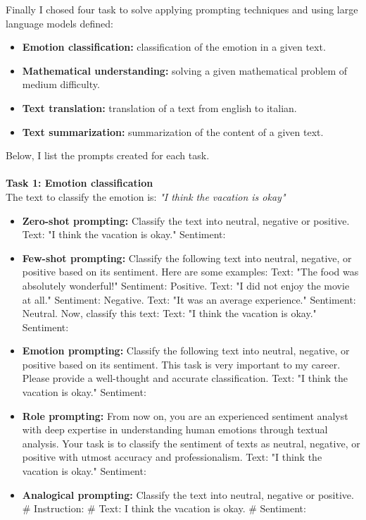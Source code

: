 Finally I chosed four task to solve applying prompting techniques and using large language models defined:
\begin{itemize}
    \item \textbf{Emotion classification:} classification of the emotion in a given text.

    \item \textbf{Mathematical understanding:} solving a given mathematical problem of medium difficulty. 

    \item \textbf{Text translation:} translation of a text from english to italian.

    \item \textbf{Text summarization:} summarization of the content of a given text.
\end{itemize}
Below, I list the prompts created for each task.\\\\
\textbf{Task 1: Emotion classification}\\     
The text to classify the emotion is: \textit{"I think the vacation is okay"}
\begin{itemize}
    \item \textbf{Zero-shot prompting:} Classify the text into neutral, negative or positive. Text: "I think the vacation is okay." Sentiment:
    \item \textbf{Few-shot prompting:} Classify the following text into neutral, negative, or positive based on its sentiment. Here are some examples: 
    Text: "The food was absolutely wonderful!" Sentiment: Positive. 
    Text: "I did not enjoy the movie at all." Sentiment: Negative. 
    Text: "It was an average experience." Sentiment: Neutral. 
    Now, classify this text: Text: "I think the vacation is okay." Sentiment:
    \item \textbf{Emotion prompting:} Classify the following text into neutral, negative, or positive based on its sentiment. This task is very important to my career. Please provide a well-thought and accurate classification. Text: "I think the vacation is okay." Sentiment:
    \item \textbf{Role prompting:} From now on, you are an experienced sentiment analyst with deep expertise in understanding human emotions through textual analysis. Your task is to classify the sentiment of texts as neutral, negative, or positive with utmost accuracy and professionalism. Text: "I think the vacation is okay." Sentiment:
    \item \textbf{Analogical prompting:} Classify the text into neutral, negative or positive. \# Instruction: \# Text: I think the vacation is okay. \# Sentiment:
\end{itemize}
